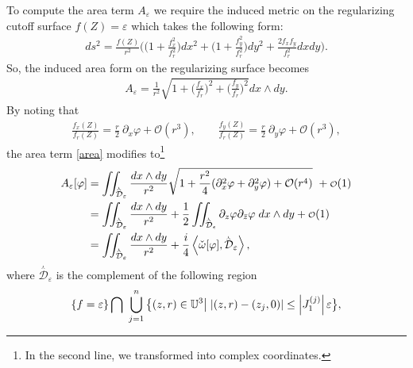 \documentclass[a4paper,11pt]{article}
\newcommand{\singfund}{\overset{{}_{\curlywedge}}{\mathcal{D}}}
\newcommand\smallO{
	\mathchoice
	{{\scriptstyle\mathcal{O}}}%
	{{\scriptstyle\mathcal{O}}}%
	{{\scriptscriptstyle\mathcal{O}}}%
	{\scalebox{.7}{$\scriptscriptstyle\mathcal{O}$}}%
}
\newcommand{\stks}[1]{
	 \left< #1 \right>
}
\begin{document}
To compute the area term
$A_{\varepsilon}$ we require the induced metric on the regularizing cutoff surface $f(Z)=\varepsilon$ which takes the following form:
\begin{equation}
	\begin{aligned}
		ds^2 = \frac{f(Z)}{r^2} \bigg(
		\big(1+ \frac{f_x^2}{f_r^2}\big)dx^2 + 
		\big(1+ \frac{f_y^2}{f_r^2}\big)dy^2 +
		\frac{2f_xf_y}{f^2_r} dxdy
		\bigg).
	\end{aligned}
\end{equation}
So, the induced  area form on the regularizing surface becomes
\begin{equation}
	\begin{aligned}
		A_\varepsilon = \frac{1}{r^2} \sqrt{1+ \Big(\frac{f_x}{f_r}\Big)^2+ \Big(\frac{f_y}{f_r}\Big)^2} dx\wedge dy.
	\end{aligned}\label{area}
\end{equation}
By noting that
\begin{equation}
	\begin{aligned}
		\frac{f_x(Z)}{f_r(Z)}= \frac{r}{2}~ \partial_x \varphi +\mathcal{O}(r^3), \qquad 
		\frac{f_y(Z)}{f_r(Z)}= \frac{r}{2}~ \partial_y \varphi + \mathcal{O}(r^3),
	\end{aligned}
\end{equation}
the area term \eqref{area} modifies to\footnote{In the second line, we transformed into complex coordinates.}
\begin{equation}
\begin{aligned}
A_\varepsilon[\varphi] &= \iint_{\singfund_{\varepsilon}} \frac{dx\wedge dy}{r^2}\sqrt{1+ \frac{r^2}{4}(\partial_x^2 \varphi + \partial_y^2 \varphi)+ \mathcal{O}(r^4)}  
~ + \smallO(1) \\ &= 
\iint_{\singfund_{\varepsilon}}  \frac{dx\wedge dy}{r^2}  + \frac12\iint_{\singfund_{\epsilon}}
\partial_z \varphi \partial_{\bar{z}} \varphi \; dx\wedge dy + \smallO(1) \\ &=
\iint_{\singfund_{\varepsilon}}  \frac{dx\wedge dy}{r^2} + \frac{i}{4} \stks{ \check{\omega}[\varphi],\singfund_{\varepsilon}},
\end{aligned}
\label{Aeps}
\end{equation}
where $\singfund_{\varepsilon}$ is the complement of the following region
\begin{equation}
\{f=\varepsilon\}\bigcap ~ \bigcup_{j=1}^{n}\big{\{} (z,r)\in \mathbb{U}^3 \big{|}\hspace{1mm}|(z,r)-(z_j,0)|\leq \Big|J_{1}^{(j)}\Big|\hspace{.5mm}\varepsilon\big{\}},\label{Depsi}
\end{equation}
\end{document}
